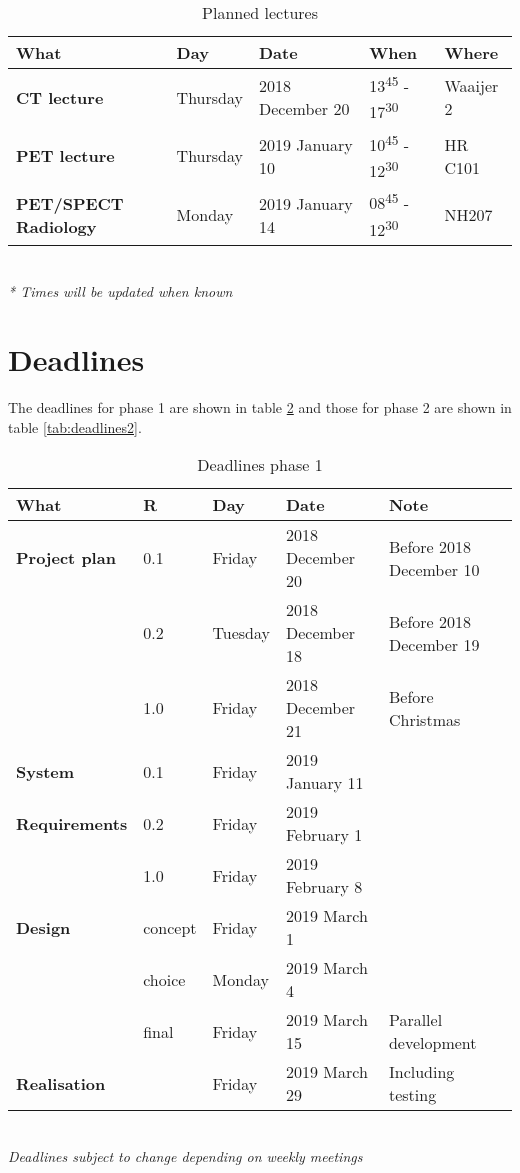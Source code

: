 \begin{table} [h!]
	\begin{tabular}{l|llll}
		\textbf{What} 		&	Day 		&	Date				&	When & Where\\
		\hline
		\textbf{CT lecture}	&	Thursday	&	2018 December 20	& 13\textsuperscript{45} - 17\textsuperscript{30} & Waaijer 2\\
		\rowcolor{Gray}
		\textbf{PET lecture}&	Thursday	& 	2019 January 10 	& 10\textsuperscript{45} - 12\textsuperscript{30} & HR C101 \\
		\textbf{PET/SPECT Radiology}& 	Monday 	&	2019 January 14	& 08\textsuperscript{45} - 12\textsuperscript{30} & NH207\\
		\hline
	\end{tabular} \\
	\textit{* Times will be updated when known}
	\caption{Planned lectures}
	\label{tab:lectures}
\end{table}

\newpage
\section{Deadlines}
The deadlines for phase 1 are shown in table \ref{tab:deadlines} and those for phase 2 are shown in table \ref{tab:deadlines2}.

\begin{table}[h!]
	\begin{tabular}{l|llll}
		\textbf{What} 		&	R	& 	Day	&	Date	&	Note \\
		\hline
		\textbf{Project plan}& 0.1	& Friday 		& 2018 December 20	&	Before 2018 December 10 \\
		\rowcolor{Gray}
		 	&	0.2 	&	 Tuesday & 2018 December 18 & Before 2018 December 19\\
		 	&	1.0		&	Friday	&  2018 December 21 & Before Christmas\\
		 	\hline
		 	\rowcolor{Gray}
		\textbf{System} & 0.1 & Friday & 2019 January 11 & \\
		\textbf{Requirements}& 0.2 & Friday & 2019 February 1 & \\
		\rowcolor{Gray}
			&	1.0		& Friday &	2019 February 8 &\\
		\hline
		\textbf{Design} & concept &Friday & 2019 March 1 & \\
		\rowcolor{Gray}
		 & choice & Monday & 2019 March 4 &  \\
		 & final  & Friday & 2019 March 15 & Parallel development \\
		 \hline
		 \rowcolor{Gray}
		 \textbf{Realisation} & & Friday & 2019 March 29 & Including testing\\
		 \hline
	\end{tabular} \\
	\textit{Deadlines subject to change depending on weekly meetings}
	\caption{Deadlines phase 1}
	\label{tab:deadlines}
\end{table}

